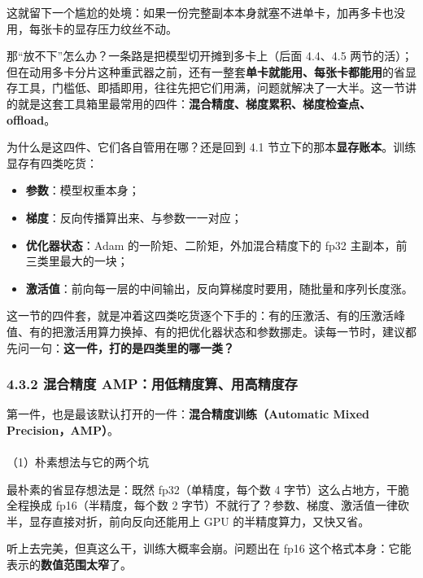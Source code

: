 \documentclass[
  chinese,
]{ctexart}
\makeatletter
\let\oldparagraph\paragraph
\renewcommand{\paragraph}{
    \@ifstar
      \xxxParagraphStar
      \xxxParagraphNoStar
  }
\newcommand{\xxxParagraphStar}[1]{\oldparagraph*{#1}\mbox{}}
\newcommand{\xxxParagraphNoStar}[1]{\oldparagraph{#1}\mbox{}}
\providecommand{\tightlist}{%
  \setlength{\itemsep}{0pt}\setlength{\parskip}{0pt}}
\makeatother
\begin{document}
这就留下一个尴尬的处境：如果一份完整副本本身就塞不进单卡，加再多卡也没用，每张卡的显存压力纹丝不动。

那``放不下''怎么办？一条路是把模型切开摊到多卡上（后面 4.4、4.5
两节的活）；但在动用多卡分片这种重武器之前，还有一整套\textbf{单卡就能用、每张卡都能用}的省显存工具，门槛低、即插即用，往往先把它们用满，问题就解决了一大半。这一节讲的就是这套工具箱里最常用的四件：\textbf{混合精度、梯度累积、梯度检查点、offload}。

为什么是这四件、它们各自管用在哪？还是回到 4.1
节立下的那本\textbf{显存账本}。训练显存有四类吃货：

\begin{itemize}
\tightlist
\item
  \textbf{参数}：模型权重本身；
\item
  \textbf{梯度}：反向传播算出来、与参数一一对应；
\item
  \textbf{优化器状态}：Adam 的一阶矩、二阶矩，外加混合精度下的 fp32
  主副本，前三类里最大的一块；
\item
  \textbf{激活值}：前向每一层的中间输出，反向算梯度时要用，随批量和序列长度涨。
\end{itemize}

这一节的四件套，就是冲着这四类吃货逐个下手的：有的压激活、有的压激活峰值、有的把激活用算力换掉、有的把优化器状态和参数挪走。读每一节时，建议都先问一句：\textbf{这一件，打的是四类里的哪一类？}

\subsubsection{4.3.2 混合精度
AMP：用低精度算、用高精度存}\label{ux6df7ux5408ux7cbeux5ea6-ampux7528ux4f4eux7cbeux5ea6ux7b97ux7528ux9ad8ux7cbeux5ea6ux5b58}

第一件，也是最该默认打开的一件：\textbf{混合精度训练（Automatic Mixed
Precision，AMP）}。

\paragraph{（1）朴素想法与它的两个坑}\label{ux6734ux7d20ux60f3ux6cd5ux4e0eux5b83ux7684ux4e24ux4e2aux5751}

最朴素的省显存想法是：既然 fp32（单精度，每个数 4
字节）这么占地方，干脆全程换成 fp16（半精度，每个数 2
字节）不就行了？参数、梯度、激活值一律砍半，显存直接对折，前向反向还能用上
GPU 的半精度算力，又快又省。

听上去完美，但真这么干，训练大概率会崩。问题出在 fp16
这个格式本身：它能表示的\textbf{数值范围太窄}了。
\end{document}
